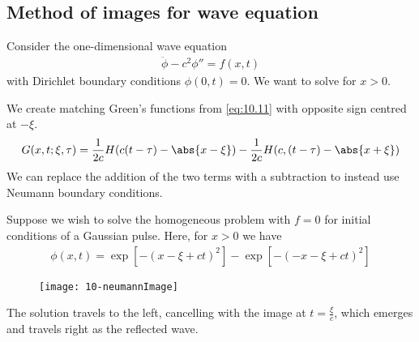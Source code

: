 \subsection{Method of images for wave equation}
Consider the one-dimensional wave equation
\begin{align*}
	\ddot \phi - c^2 \phi'' = f(x,t)
\end{align*}
with Dirichlet boundary conditions $\phi(0,t) = 0$.
We want to solve for $x > 0$.

We create matching Green's functions from \cref{eq:10.11} with opposite sign centred at $-\xi$.
\begin{align*}
	G(x,t;\xi,\tau) = \frac{1}{2c} H(c(t-\tau) - \abs{x-\xi}) - \frac{1}{2c} H(c,(t-\tau) - \abs{x+\xi})
\end{align*}
We can replace the addition of the two terms with a subtraction to instead use Neumann boundary conditions.

Suppose we wish to solve the homogeneous problem with $f = 0$ for initial conditions of a Gaussian pulse.
Here, for $x > 0$ we have
\begin{align} \label{eq:10.25}
	\phi(x,t) = \exp[-(x-\xi + ct)^2] - \exp[-(-x - \xi + ct)^2]
\end{align}
\begin{figure}[h]
    \centering
    \texttt{[image: 10-neumannImage]}
\end{figure}
The solution travels to the left, cancelling with the image at $t = \frac{\xi}{c}$, which emerges and travels right as the reflected wave.